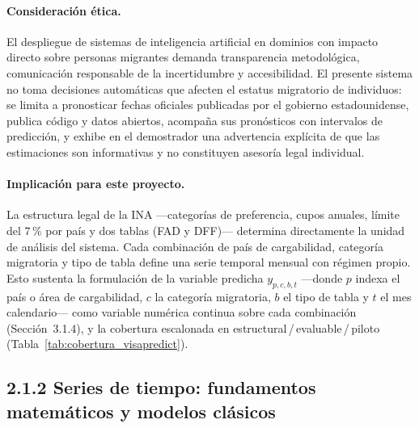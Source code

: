\documentclass[12pt,letterpaper]{report}
\begin{document}
\paragraph{Consideración ética.} El despliegue de sistemas de inteligencia artificial en dominios con impacto directo sobre personas migrantes demanda transparencia metodológica, comunicación responsable de la incertidumbre y accesibilidad. El presente sistema no toma decisiones automáticas que afecten el estatus migratorio de individuos: se limita a pronosticar fechas oficiales publicadas por el gobierno estadounidense, publica código y datos abiertos, acompaña sus pronósticos con intervalos de predicción, y exhibe en el demostrador una advertencia explícita de que las estimaciones son informativas y no constituyen asesoría legal individual.

\paragraph{Implicación para este proyecto.} La estructura legal de la INA ---categorías de preferencia, cupos anuales, límite del 7\,\% por país y dos tablas (FAD y DFF)--- determina directamente la unidad de análisis del sistema. Cada combinación de país de cargabilidad, categoría migratoria y tipo de tabla define una serie temporal mensual con régimen propio. Esto sustenta la formulación de la variable predicha $y_{p,c,b,t}$ ---donde $p$ indexa el país o área de cargabilidad, $c$ la categoría migratoria, $b$ el tipo de tabla y $t$ el mes calendario--- como variable numérica continua sobre cada combinación (Sección~3.1.4), y la cobertura escalonada en estructural\,/\,evaluable\,/\,piloto (Tabla~\ref{tab:cobertura_visapredict}).

\subsection{2.1.2 Series de tiempo: fundamentos matemáticos y modelos clásicos}
\end{document}
